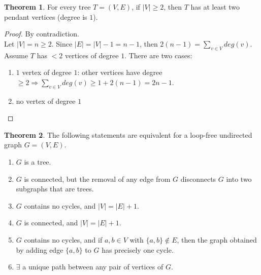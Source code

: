 \documentclass[letter]{book}
\theoremstyle{definition}
\newtheorem{theorem}{Theorem}[chapter]
\theoremstyle{definition}
\theoremstyle{remark}
\begin{document}
\begin{theorem}
    For every tree $T=(V,E)$, if $|V|\geq2$, then $T$ has at least two pendant vertices (degree is $1$).
    \begin{proof} By contradiction.\\
        Let $|V|=n\geq2$. Since $|E|=|V|-1=n-1$, then $2(n-1)=\sum_{v\in V}{deg(v)}$.\\
        Assume $T$ has $<2$ vertices of degree $1$. There are two cases:
        \begin{enumerate}
            \item $1$ vertex of degree $1$: other vertices have degree $\geq 2\Rightarrow \sum_{v\in V}{deg(v)}\geq 1+2(n-1)=2n-1$.
            \item no vertex of degree $1$
        \end{enumerate}
    \end{proof}
\end{theorem}
\bigskip
\begin{theorem}
    The following statements are equivalent for a loop-free undirected graph $G=(V,E)$.
    \begin{enumerate}[label=\alph*)]
        \item $G$ is a tree.
        \item $G$ is connected, but the removal of any edge from $G$ disconnects $G$ into two subgraphs that are trees.
        \item $G$ contains no cycles, and $|V|=|E|+1$.
        \item $G$ is connected, and $|V|=|E|+1$.
        \item $G$ contains no cycles, and if $a,b\in V$ with $\{a,b\}\notin E$, then the graph obtained by adding edge $\{a,b\}$ to $G$ has precisely one cycle.
        \item $\exists$ a unique path between any pair of vertices of $G$.
    \end{enumerate}
\end{theorem}
\end{document}
